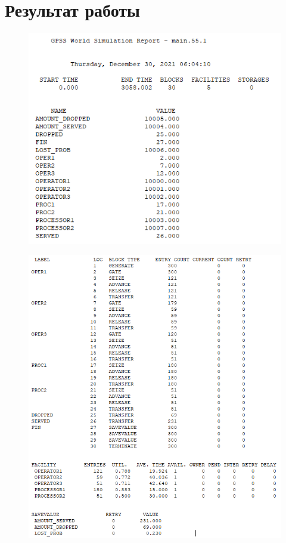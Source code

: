\documentclass[12pt,a4paper,oneside]{report}
\begin{document}
\newpage
\section*{Результат работы}
\begin{figure}[!h]
	\centering
	\includegraphics[scale=0.85]{1.png}
	\label{fig:screenshot004}
\end{figure}

\begin{figure}[!h]
	\centering
	\includegraphics[scale=0.85]{2.png}
	\label{fig:screenshot005}
\end{figure}
\end{document}
